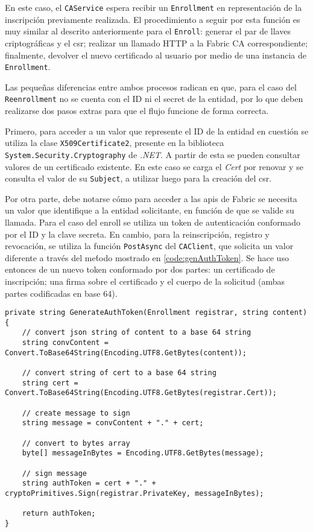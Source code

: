 En este caso, el \texttt{CAService} espera recibir un \texttt{Enrollment} en representaci\'on de la inscripci\'on previamente realizada. El procedimiento a seguir por esta funci\'on es muy similar al descrito anteriormente para el \texttt{Enroll}: generar el par de llaves criptogr\'aficas y el csr; realizar un llamado HTTP a la Fabric CA correspondiente; finalmente, devolver el nuevo certificado al usuario por medio de una instancia de \texttt{Enrollment}.

Las peque\~nas diferencias entre ambos procesos radican en que, para el caso del \texttt{Reenrollment} no se cuenta con el ID ni el secret de la entidad, por lo que deben realizarse dos pasos extras para que el flujo funcione de forma correcta.

Primero, para acceder a un valor que represente el ID de la entidad en cuesti\'on se utiliza la clase \texttt{X509Certificate2}, presente en la biblioteca \texttt{System.Security.Cryptography} de \emph{.NET}. A partir de esta se pueden consultar valores de un certificado existente. En este caso se carga el \emph{Cert} por renovar y se consulta el valor de su \texttt{Subject}, a utilizar luego para la creaci\'on del csr.

Por otra parte, debe notarse c\'omo para acceder a las apis de Fabric se necesita un valor que identifique a la entidad solicitante, en funci\'on de que se valide su llamada. Para el caso del enroll se utiliza un token de autenticaci\'on conformado por el ID y la clave secreta. En cambio, para la reinscripci\'on, registro y revocaci\'on, se utiliza la funci\'on \texttt{PostAsync} del \texttt{CAClient}, que solicita un valor diferente a trav\'es del me\'todo mostrado en \ref{code:genAuthToken}. Se hace uso entonces de un nuevo token conformado por dos partes: un certificado de inscripción; una firma sobre el certificado y el cuerpo de la solicitud (ambas partes codificadas en base 64).

\begin{lstlisting}[caption={M\'etodo \texttt{GenerateAuthToken} de la clase \texttt{CAClient}.}, label={code:genAuthToken}]
private string GenerateAuthToken(Enrollment registrar, string content) {
	// convert json string of content to a base 64 string
	string convContent = Convert.ToBase64String(Encoding.UTF8.GetBytes(content));

	// convert string of cert to a base 64 string
	string cert = Convert.ToBase64String(Encoding.UTF8.GetBytes(registrar.Cert));

	// create message to sign
	string message = convContent + "." + cert;

	// convert to bytes array
	byte[] messageInBytes = Encoding.UTF8.GetBytes(message);

	// sign message
	string authToken = cert + "." + cryptoPrimitives.Sign(registrar.PrivateKey, messageInBytes);

	return authToken;
}
\end{lstlisting}

